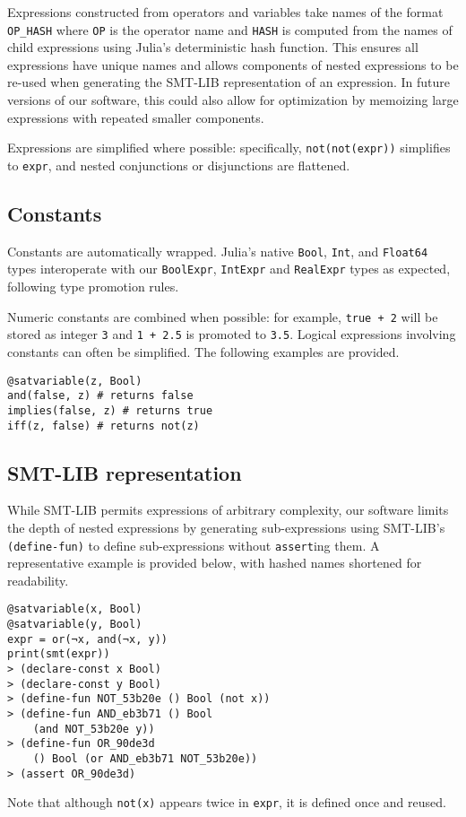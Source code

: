 \documentclass[conference]{IEEEtran}
\begin{document}
Expressions constructed from operators and variables take names of the format \verb|OP_HASH| where \verb|OP| is the operator name and \verb|HASH| is computed from the names of child expressions using Julia's deterministic hash function. This ensures all expressions have unique names and allows components of nested expressions to be re-used when generating the SMT-LIB representation of an expression. In future versions of our software, this could also allow for optimization by memoizing large expressions with repeated smaller components.

Expressions are simplified where possible: specifically, \verb|not(not(expr))| simplifies to \verb|expr|, and nested conjunctions or disjunctions are flattened.

\subsection{Constants}
Constants are automatically wrapped. Julia's native \verb|Bool|, \verb|Int|, and \verb|Float64| types interoperate with our \verb|BoolExpr|, \verb|IntExpr| and \verb|RealExpr| types as expected, following type promotion rules.

Numeric constants are combined when possible: for example, \verb|true + 2| will be stored as integer \verb|3| and \verb|1 + 2.5| is promoted to \verb|3.5|. Logical expressions involving constants can often be simplified. The following examples are provided.
\begin{verbatim}
@satvariable(z, Bool)
and(false, z) # returns false
implies(false, z) # returns true
iff(z, false) # returns not(z)
\end{verbatim}

\subsection{SMT-LIB representation}

While SMT-LIB permits expressions of arbitrary complexity, our software limits the depth of nested expressions by generating sub-expressions using SMT-LIB's \verb|(define-fun)| to define sub-expressions without \verb|assert|ing them. %
A representative example is provided below, with hashed names shortened for readability.
\begin{verbatim}
@satvariable(x, Bool)
@satvariable(y, Bool)
expr = or(¬x, and(¬x, y))
print(smt(expr))
> (declare-const x Bool)
> (declare-const y Bool)
> (define-fun NOT_53b20e () Bool (not x))
> (define-fun AND_eb3b71 () Bool
    (and NOT_53b20e y))
> (define-fun OR_90de3d
    () Bool (or AND_eb3b71 NOT_53b20e))
> (assert OR_90de3d)
\end{verbatim}
Note that although \verb|not(x)| appears twice in \verb|expr|, it is defined once and reused.
\end{document}
